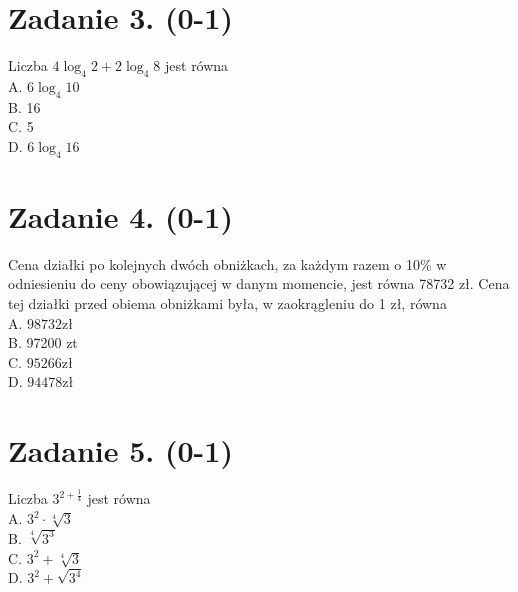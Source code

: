\documentclass[10pt]{article}
\begin{document}
\section*{Zadanie 3. (0-1)}
Liczba \(4 \log _{4} 2+2 \log _{4} 8\) jest równa\\
A. \(6 \log _{4} 10\)\\
B. 16\\
C. 5\\
D. \(6 \log _{4} 16\)

\section*{Zadanie 4. (0-1)}
Cena działki po kolejnych dwóch obniżkach, za każdym razem o 10\% w odniesieniu do ceny obowiązującej w danym momencie, jest równa 78732 zł. Cena tej działki przed obiema obniżkami była, w zaokrągleniu do 1 zł, równa\\
A. \(98732 \mathrm{zł}\)\\
B. 97200 zt\\
C. \(95266 \mathrm{zł}\)\\
D. \(94478 \mathrm{zł}\)

\section*{Zadanie 5. (0-1)}
Liczba \(3^{2+\frac{1}{4}}\) jest równa\\
A. \(3^{2} \cdot \sqrt[4]{3}\)\\
B. \(\sqrt[4]{3^{3}}\)\\
C. \(3^{2}+\sqrt[4]{3}\)\\
D. \(3^{2}+\sqrt{3^{4}}\)
\end{document}
